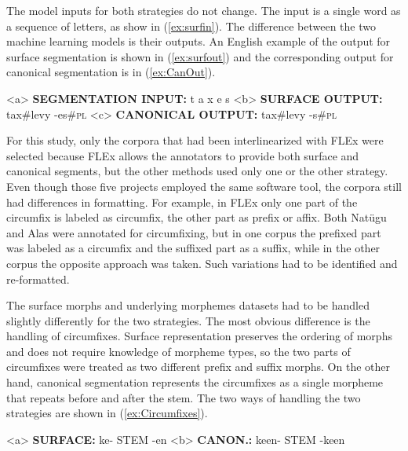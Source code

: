 The model inputs for both strategies do not change. The input is a single word as a sequence of letters, as show in (\ref{ex:surfin}). 
The difference between the two machine learning models is their outputs.  An English example of the output for surface segmentation is shown in (\ref{ex:surfout}) and the corresponding output for canonical segmentation is in (\ref{ex:CanOut}).

\pex   
\label{ex:CanInOut}
\a<a> \textbf{SEGMENTATION INPUT:} \hspace{2 mm} t \hspace{2 mm} a \hspace{2 mm} x \hspace{2 mm} e \hspace{2 mm} s
\label{ex:surfin}
\a<b> \textbf{SURFACE OUTPUT:} \hspace{9 mm} tax\#levy \hspace{3 mm} -es\#\textsc{pl}
\label{ex:surfout}
\a<c> \textbf{CANONICAL OUTPUT:} \hspace{2 mm} tax\#levy \hspace{3 mm} -s\#\textsc{pl} 
\label{ex:CanOut}
\xe

For this study, only the corpora that had been interlinearized with FLEx were selected because FLEx allows the annotators to provide both surface and canonical segments, but the other methods used only one or the other strategy. 
Even though those five projects employed the same software tool, the corpora still had differences in formatting. For example, in FLEx only one part of the circumfix is labeled as circumfix, the other part as prefix or affix. Both Nat\"ugu and Alas were annotated for circumfixing, but in one corpus the prefixed part was labeled as a circumfix and the suffixed part as a suffix, while in the other corpus the opposite approach was taken. Such variations had to be identified and re-formatted.

The surface morphs and underlying morphemes datasets had to be handled slightly differently for the two strategies. The most obvious difference is the handling of circumfixes. Surface representation preserves the ordering of morphs and does not require knowledge of morpheme types, so the two parts of circumfixes were treated as two different prefix and suffix morphs.  On the other hand, canonical segmentation represents the circumfixes as a single morpheme that repeats before and after the stem. The two ways of handling the two strategies are shown in (\ref{ex:Circumfixes}).

\pex   
\label{ex:Circumfixes}
\a<a> \textbf{SURFACE:} \hspace{2 mm} ke- \hspace{4 mm}  STEM  \hspace{1 mm} -en
\label{ex:circumsurf}
\a<b> \textbf{CANON.:} \hspace{1 mm} ke\textlangle{}\textrangle{}en- \hspace{1 mm} STEM \hspace{1 mm} -ke\textlangle{}\textrangle{}en
\label{ex:circumcan}
\xe

